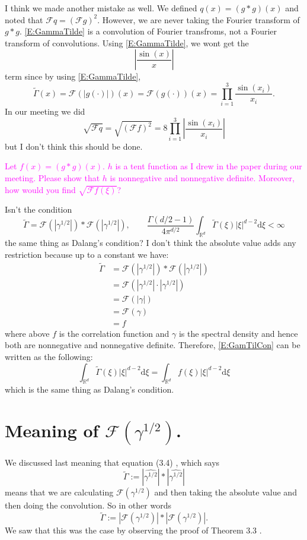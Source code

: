 \documentclass{article}
\numberwithin{equation}{section}
\newcommand{\R}{\mathbb{R}}
\newcommand{\ud}{\ensuremath{\mathrm{d}}}
\begin{document}
I think we made another mistake as well. We defined $q(x) = (g*g)(x)$ and noted that $\mathcal{F}q = (\mathcal{F}g)^2$. However, we are never taking the Fourier transform of $g*g$. \eqref{E:GammaTilde} is a convolution of Fourier transfroms, not a Fourier transform of convolutions. Using \eqref{E:GammaTilde}, we wont get the
	\[
		\left|\frac{\sin(x)}{x}\right|
	\]
term since by using \eqref{E:GammaTilde},
	\[
		\tilde{\Gamma}(x) = \mathcal{F}\left( |g(\cdot)| \right)(x)  = \mathcal{F}\left( g(\cdot)\right)(x) = \prod_{i=1}^3\frac{\sin(x_i)}{x_i}.
	\]
In our meeting we did
	\[
		\sqrt{\mathcal{F}q} = \sqrt{(\mathcal{F}f)^2} = 8\prod_{i=1}^3 \left| \frac{\sin(x_i)}{x_i} \right|
	\]
but I don't think this should be done.

\bigskip

\textcolor{magenta}{Let $f(x) = (g*g)(x)$.  $h$ is a tent function as I drew in the paper during our
meeting. Please show that $h$ is nonnegative and nonnegative definite. Moreover, how would you find
$\sqrt{\mathcal{F}f (\xi)}$?}

Isn't the condition 	
	\begin{equation}\label{E:GamTilCon}
	\tilde{\Gamma} = \mathcal{F}(|\gamma^{1/2}|) * \mathcal{F}(|\gamma^{1/2}|), \quad \quad \frac{\Gamma(d/2 -1 )}{4 \pi^{d/2}} \int_{\R^d} \tilde{\Gamma}(\xi) |\xi|^{d-2} \ud \xi < \infty
	\end{equation}
the same thing as Dalang's condition? I don't think the absolute value adds any restriction because up to a constant we have:
	\begin{align*}
			\tilde{\Gamma} &= \mathcal{F}(|\gamma^{1/2}|) * \mathcal{F}(|\gamma^{1/2}|) 
			\\ &= \mathcal{F}\left( |\gamma^{1/2}| \cdot |\gamma^{1/2}| \right)
			\\& = \mathcal{F}( |\gamma| )
			\\& = \mathcal{F}( \gamma )
			\\& = f
	\end{align*}
where above $f$ is the correlation function and $\gamma$ is the spectral density and hence both are nonnegative and nonnegative definite. Therefore, \eqref{E:GamTilCon} can be written as the following:
	\[
		\int_{\R^d} \tilde{\Gamma}(\xi) |\xi|^{d-2} \ud \xi = 	\int_{\R^d} f(\xi) |\xi|^{d-2} \ud \xi
	\] 
which is the same thing as Dalang's condition. 

\section{Meaning of $\mathcal{F}(\gamma^{1/2})$.}
We discussed last meaning that equation (3.4) \cite{TZ98}, which says 
	\[
		\tilde{\Gamma} := |\widehat{\gamma^{1/2}}|*|\widehat{\gamma^{1/2}}|
	\]
means that we are calculating $\mathcal{F}(\gamma^{1/2})$ and then taking the absolute value and then doing the convolution. So in other words 
	\begin{equation}\label{E:GamTil}
			\tilde{\Gamma} := |\mathcal{F}(\gamma^{1/2})|* |\mathcal{F}(\gamma^{1/2})|.
	\end{equation}
We saw that this was the case by observing the proof of Theorem 3.3 \cite{TZ98}.
	
\end{document}
